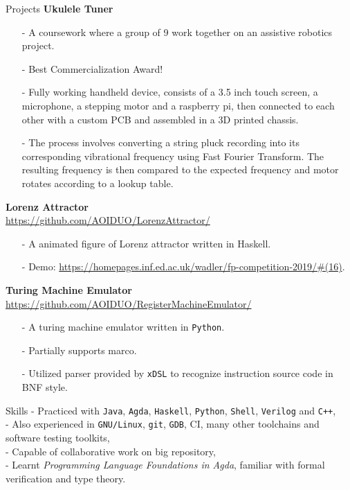 \documentclass{resume} %
\newcommand{\itemsepval}{-6pt}
\newcommand{\code}{\texttt}
\begin{document}
\begin{rSection}{Projects}
    \textbf{Ukulele Tuner} 
        \begin{itemize}
        \itemsep \itemsepval {} 
        \item[-] A coursework where a group of 9 work together on an assistive robotics project.
        \item[-] Best Commercialization Award!
        \item[-] Fully working handheld device, consists of a 3.5 inch touch screen, a microphone, a stepping motor and a raspberry pi, then connected to each other with a custom PCB and assembled in a 3D printed chassis. 
        \item[-] The process involves converting a string pluck recording into its corresponding vibrational frequency using Fast Fourier Transform. The resulting frequency is then compared to the expected frequency and motor rotates according to a lookup table. 
    \end{itemize}

    \textbf{Lorenz Attractor} \hfill \\
    \url{https://github.com/AOIDUO/LorenzAttractor/} \hfill \par
    \begin{itemize}
        \itemsep \itemsepval {} 
        \item[-] A animated figure of Lorenz attractor written in Haskell.
        \item[-] Demo: \url{https://homepages.inf.ed.ac.uk/wadler/fp-competition-2019/#(16)}.
    \end{itemize}

    \textbf{Turing Machine Emulator} \hfill \\ 
    \url{https://github.com/AOIDUO/RegisterMachineEmulator/} \hfill \par
    \begin{itemize}
        \itemsep \itemsepval {} 
        \item[-] A turing machine emulator written in \code{Python}.
        \item[-] Partially supports marco. 
        \item[-] Utilized parser provided by \code{xDSL} to recognize instruction source code in BNF style.
    \end{itemize}


\end{rSection} 

\begin{rSection}{Skills}
    - Practiced with \code{Java}, \code{Agda}, \code{Haskell}, \code{Python}, \code{Shell}, \code{Verilog} and \code{C++}, \\
    - Also experienced in \code{GNU/Linux}, \code{git}, \code{GDB}, CI, many other toolchains and software testing toolkits, \\
    - Capable of collaborative work on big repository, \\
    - Learnt \emph{Programming Language Foundations in Agda}, familiar with formal verification and type theory. 
\end{rSection} 
\end{document}
